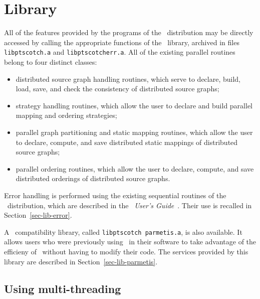 
\section{Library}
\label{sec-lib}

All of the features provided by the programs of the
\ptscotch\ distribution may be directly accessed by calling
the appropriate functions of the \libscotch\ library, archived
in files {\tt libptscotch.a} and {\tt libptscotcherr.a}.
All of the existing parallel routines belong to four distinct classes:
\begin{itemize}
\item
distributed source graph handling routines, which serve to declare,
build, load, save, and check the consistency of distributed source
graphs;
\item
strategy handling routines, which allow the user to declare and build
parallel mapping and ordering strategies;
\item
parallel graph partitioning and static mapping routines, which allow
the user to declare, compute, and save distributed static mappings of
distributed source graphs;
\item
parallel ordering routines, which allow the user to declare, compute,
and save distributed orderings of distributed source graphs.
\end{itemize}
Error handling is performed using the existing sequential routines of
the \scotch\ distribution, which are described in the
{\it\scotch\ User's Guide}~\scotchcitesuser. Their use is recalled in
Section~\ref{sec-lib-error}.

A \parmetis\ compatibility library, called {\tt lib\lbo ptscotch\lbo
parmetis.a}, is also available. It allows users who were previously
using \parmetis\ in their software to take advantage of the efficieny
of \ptscotch\ without having to modify their code. The services
provided by this library are described in
Section~\ref{sec-lib-parmetis}.

\subsection{Using multi-threading}
\label{sec-lib-thread}

